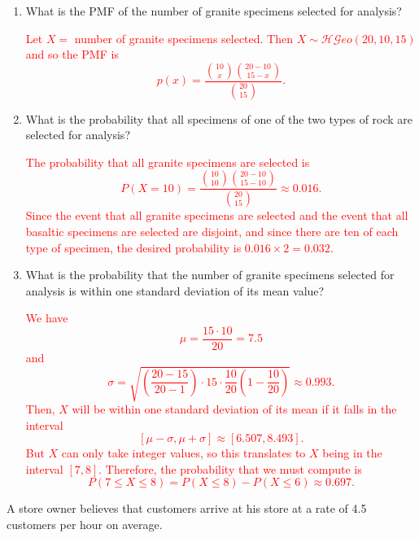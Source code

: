 \documentclass[12pt,reqno]{amsart}
\begin{document}
\medskip
\begin{enumerate}
\item What is the PMF of the number of granite specimens selected for analysis?

\bigskip
\textcolor{red}{Let $X=$ number of granite specimens selected. Then $X\sim \mathcal{HG}eo(20, 10, 15)$ and so the PMF is
	\[p(x) = \frac{\binom{10}{x} \binom{20-10}{15-x}}{\binom{20}{15}}.
	\]}
\bigskip

\item What is the probability that all specimens of one of the two types of rock are selected for analysis?

\bigskip
\textcolor{red}{The probability that all granite specimens are selected is
	\[P(X=10) = \frac{\binom{10}{10} \binom{20-10}{15-10}}{\binom{20}{15}} \approx 0.016.
	\]
Since the event that all granite specimens are selected and the event that all basaltic specimens are selected are disjoint, and since there are ten of each type of specimen, the desired probability is $0.016 \times 2 = 0.032$.}
\bigskip

\item What is the probability that the number of granite specimens selected for analysis is within one standard deviation of its mean value?

\bigskip
\textcolor{red}{We have
	\[\mu = \frac{15\cdot 10}{20}=7.5
	\]
and
	\[\sigma = \sqrt{\left(\frac{20-15}{20-1}\right) \cdot 15 \cdot \frac{10}{20} \left(1- \frac{10}{20} \right)} \approx 0.993.
	\]
Then, $X$ will be within one standard deviation of its mean if it falls in the interval
	\[[\mu-\sigma, \mu + \sigma] \approx [6.507, 8.493].
	\]
But $X$ can only take integer values, so this translates to $X$ being in the interval $[7,8]$. Therefore, the probability that we must compute is
	\[P(7 \leq X \leq 8) = P(X \leq 8) - P(X \leq 6) \approx 0.697.
	\]}

\end{enumerate}


















\bigskip
\prob A store owner believes that customers arrive at his store at a rate of 4.5 customers per hour on average.
\end{document}
